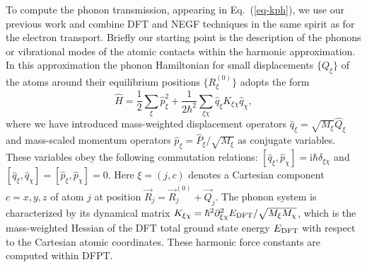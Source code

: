 \documentclass[aps,amsmath,amssymb,twocolumn,showpacs]{revtex4-1}
\begin{document}
To compute the phonon transmission, appearing in Eq.~(\ref{eq-kph}), we use 
our previous work \cite{Burkle2015,Klockner2016,Cui2017,Klockner2017a} and
combine DFT and NEGF techniques in the same spirit as for the
electron transport. Briefly our starting point is the description of the
phonons or vibrational modes of the atomic contacts within the harmonic
approximation. In this approximation the phonon Hamiltonian for small
displacements $\{Q_{\xi}\}$ of the atoms around their equilibrium positions
$\{R_{\xi}^{(0)}\}$ adopts the form
%
\begin{equation}
  \hat H = \frac{1}{2} \sum_{\xi} \hat{p}_{\xi}^{2} + \frac{1}{2\hbar^{2}} 
  \sum_{\xi\chi} \hat{q}_{\xi} K_{\xi\chi} \hat{q}_{\chi},
\end{equation}
%
where we have introduced mass-weighted displacement operators $\hat{q}_{\xi} =
\sqrt{M_{\xi}}\hat{Q}_{\xi}$ and mass-scaled momentum operators
$\hat{p}_{\xi}=\hat{P}_{\xi}/\sqrt{M_{\xi}}$ as conjugate variables.  These
variables obey the following commutation relations:
$[\hat{q}_{\xi},\hat{p}_{\chi}] = \mbox{i}\hbar\delta_{\xi\chi}$ and
$[\hat{q}_{\xi},\hat{q}_{\chi}] = [\hat{p}_{\xi},\hat{p}_{\chi}]=0$. Here
$\xi=(j,c)$ denotes a Cartesian component $c=x,y,z$ of atom $j$ at position
$\vec{R}_{j} = \vec{R}_{j}^{(0)}+\vec{Q}_{j}$. The phonon system is
characterized by its dynamical matrix $K_{\xi\chi} = \hbar^{2}
\partial_{\xi\chi}^{2}E_{\rm DFT}/\sqrt{M_{\xi}M_{\chi}}$, which is the
mass-weighted Hessian of the DFT total ground state energy $E_{\rm DFT}$ with
respect to the Cartesian atomic coordinates. These harmonic force constants
are computed within DFPT.
\end{document}
